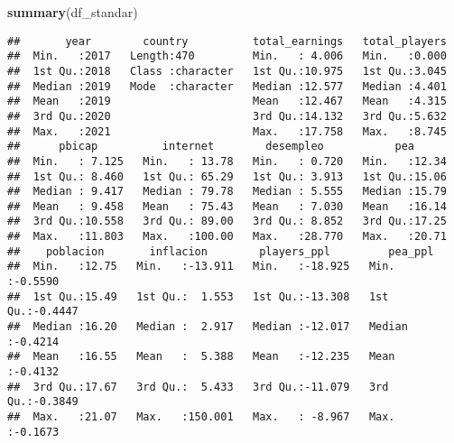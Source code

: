 \documentclass[
]{article}
\newenvironment{Shaded}{\begin{snugshade}}{\end{snugshade}}
\newcommand{\AttributeTok}[1]{\textcolor[rgb]{0.13,0.29,0.53}{#1}}
\newcommand{\CommentTok}[1]{\textcolor[rgb]{0.56,0.35,0.01}{\textit{#1}}}
\newcommand{\FunctionTok}[1]{\textcolor[rgb]{0.13,0.29,0.53}{\textbf{#1}}}
\newcommand{\NormalTok}[1]{#1}
\newcommand{\OtherTok}[1]{\textcolor[rgb]{0.56,0.35,0.01}{#1}}
\newcommand{\SpecialCharTok}[1]{\textcolor[rgb]{0.81,0.36,0.00}{\textbf{#1}}}
\newcommand{\StringTok}[1]{\textcolor[rgb]{0.31,0.60,0.02}{#1}}
\begin{document}
\begin{Shaded}
\end{Shaded}

\begin{Shaded}
\begin{Highlighting}[]
\FunctionTok{summary}\NormalTok{(df\_standar)}
\end{Highlighting}
\end{Shaded}

\begin{verbatim}
##       year        country          total_earnings   total_players  
##  Min.   :2017   Length:470         Min.   : 4.006   Min.   :0.000  
##  1st Qu.:2018   Class :character   1st Qu.:10.975   1st Qu.:3.045  
##  Median :2019   Mode  :character   Median :12.577   Median :4.401  
##  Mean   :2019                      Mean   :12.467   Mean   :4.315  
##  3rd Qu.:2020                      3rd Qu.:14.132   3rd Qu.:5.632  
##  Max.   :2021                      Max.   :17.758   Max.   :8.745  
##      pbicap          internet        desempleo           pea       
##  Min.   : 7.125   Min.   : 13.78   Min.   : 0.720   Min.   :12.34  
##  1st Qu.: 8.460   1st Qu.: 65.29   1st Qu.: 3.913   1st Qu.:15.06  
##  Median : 9.417   Median : 79.78   Median : 5.555   Median :15.79  
##  Mean   : 9.458   Mean   : 75.43   Mean   : 7.030   Mean   :16.14  
##  3rd Qu.:10.558   3rd Qu.: 89.00   3rd Qu.: 8.852   3rd Qu.:17.25  
##  Max.   :11.803   Max.   :100.00   Max.   :28.770   Max.   :20.71  
##    poblacion       inflacion        players_ppl         pea_ppl       
##  Min.   :12.75   Min.   :-13.911   Min.   :-18.925   Min.   :-0.5590  
##  1st Qu.:15.49   1st Qu.:  1.553   1st Qu.:-13.308   1st Qu.:-0.4447  
##  Median :16.20   Median :  2.917   Median :-12.017   Median :-0.4214  
##  Mean   :16.55   Mean   :  5.388   Mean   :-12.235   Mean   :-0.4132  
##  3rd Qu.:17.67   3rd Qu.:  5.433   3rd Qu.:-11.079   3rd Qu.:-0.3849  
##  Max.   :21.07   Max.   :150.001   Max.   : -8.967   Max.   :-0.1673
\end{verbatim}
\end{document}
